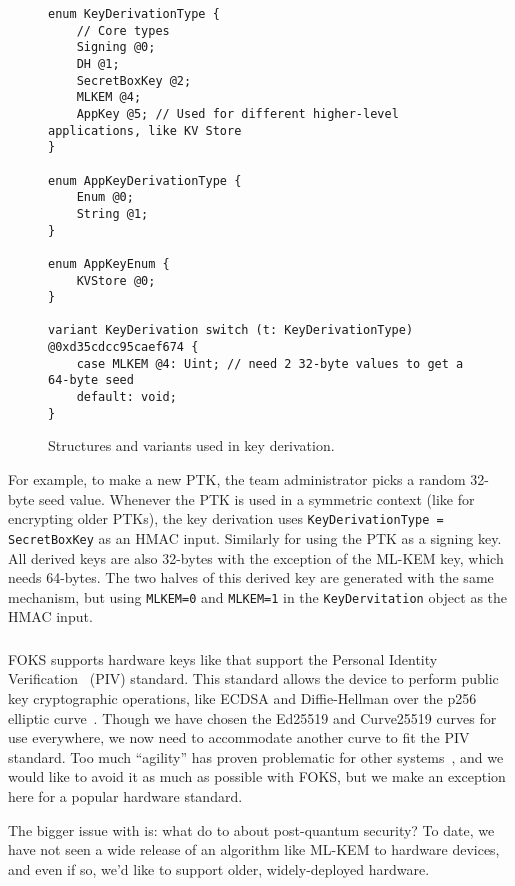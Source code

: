 \begin{figure}[ht]
  \centering
  \begin{verbatim}
enum KeyDerivationType {
    // Core types
    Signing @0;
    DH @1;
    SecretBoxKey @2;
    MLKEM @4;
    AppKey @5; // Used for different higher-level applications, like KV Store
}

enum AppKeyDerivationType {
    Enum @0;
    String @1;
}

enum AppKeyEnum {
    KVStore @0;
}

variant KeyDerivation switch (t: KeyDerivationType) @0xd35cdcc95caef674 {
    case MLKEM @4: Uint; // need 2 32-byte values to get a 64-byte seed
    default: void;
}
\end{verbatim}
  \caption{Structures and variants used in key derivation.}
  \label{fig:key-derivation}
\end{figure}

For example, to make a new PTK, the team administrator picks a random 32-byte
seed value.  Whenever the PTK is used in a symmetric context (like for
encrypting older PTKs), the key derivation uses \texttt{KeyDerivationType =
SecretBoxKey} as an HMAC input.  Similarly for using the PTK as a signing key.
All derived keys are also 32-bytes with the exception of the ML-KEM key, which
needs 64-bytes. The two halves of this derived key are generated with the same
mechanism, but using \texttt{MLKEM=0} and \texttt{MLKEM=1} in the
\texttt{KeyDervitation} object as the HMAC input.

\subsubsection{\Yubis}

FOKS supports hardware keys like \yubi{} that support the Personal Identity
Verification~\cite{nist-sp-800-73-5} (PIV) standard.  This standard allows the
device to perform public key cryptographic operations, like ECDSA and
Diffie-Hellman over the p256 elliptic curve~\cite{nist-fips-186-3}. Though we
have chosen the Ed25519 and Curve25519 curves for use everywhere, we now need to
accommodate another curve to fit the PIV standard. Too much ``agility'' has
proven problematic for other systems~\cite{jwt-none}, and we would like to avoid
it as much as possible with FOKS, but we make an exception here for a popular
hardware standard.

The bigger issue with \yubis{} is: what do to about post-quantum security?  To
date, we have not seen a wide release of an algorithm like ML-KEM to hardware
devices, and even if so, we'd like to support older, widely-deployed hardware. 

